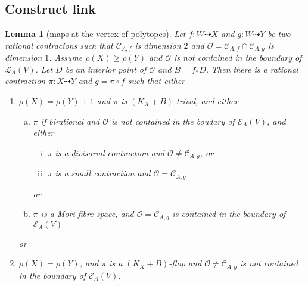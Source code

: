 \documentclass{article}
\newtheorem{lem}[defn]{Lemma}
\begin{document}
\subsection{Construct link}
\begin{lem}[maps at the vertex of polytopes]
Let $ f:W\dashrightarrow X $ and $ g:W\dashrightarrow  Y $ be two rational contracions such that $ \mathcal{C}_{A,f} $ is dimension $ 2 $ and $ \mathcal{O}=\mathcal{C}_{A,f}\cap \mathcal{C}_{A,g} $ is dimension $ 1 $. Assume $ \rho(X)\geqslant \rho(Y) $ and $ \mathcal{O} $ is not contained in the boundary of $ \mathcal{L}_{A}(V) $. Let $ D $ be an interior point of $ \mathcal{O} $ and $ B=f_*D $. Then there is a rational contraction $ \pi:X\dashrightarrow Y $ and $ g=\pi\circ f $ such that either
\begin{enumerate}[1)]
  \item $ \rho(X)=\rho(Y)+1 $ and $ \pi  $ is $ (K_X+B) $-trival, and either
  \begin{enumerate}[a)]
    \item $ \pi $ if birational and $ \mathcal{O} $ is not contained in the boudary of $ \mathcal{E}_A(V) $, and either
    \begin{enumerate}[i)]
      \item $ \pi $ is a divisorial contraction and $ \mathcal{O}\neq \mathcal{C}_{A,g} $, or
      \item $ \pi $ is a small contraction and $ \mathcal{O}= \mathcal{C}_{A,g} $
    \end{enumerate}
    or
    \item $ \pi $ is a Mori fibre space, and $ \mathcal{O}=\mathcal{C}_{A,g} $ is contained in the boundary of $ \mathcal{E}_{A}(V) $
  \end{enumerate}
or
  \item $ \rho(X)=\rho(Y) $, and $ \pi $ is  a $ (K_X+B) $-flop and $ \mathcal{O}\neq\mathcal{C}_{A,g} $ is not contained in the boundary of $ \mathcal{E}_A(V) $.
  \end{enumerate}
\end{lem}
\end{document}

